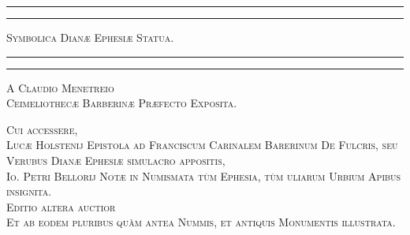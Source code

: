 \documentclass[a4paper, 11pt, oneside, polutonikogreek, latin]{article}
\begin{document}
\renewcommand{\thefigure}{\Fontauri{\arabic{figure}}}
\renewcommand\thefootnote{\Fontauri{\arabic{footnote}}}
\let\oldfootnote\footnote
    \renewcommand{\footnote}[1]{\oldfootnote{\Fontauri\large#1}}
\begin{titlepage} %
	\centering %

	
	\rule{\textwidth}{1.6pt}\vspace*{-\baselineskip}\vspace*{2pt} %
	\rule{\textwidth}{0.4pt} %
	
	\vspace{1\baselineskip} %
	
	{\scshape\Huge Symbolica Dianæ Ephesiæ Statua.}
	
	\vspace{1\baselineskip} %

	\rule{\textwidth}{0.4pt}\vspace*{-\baselineskip}\vspace{3.2pt} %
	\rule{\textwidth}{1.6pt} %
	
	\vspace{1\baselineskip} %
	
	
	{\scshape \Large A Claudio Menetreio\\Ceimeliothecæ Barberinæ Præfecto Exposita.} %
	
	\vspace*{1\baselineskip} %
	
{\scshape Cui accessere,\\Lucæ Holstenij Epistola ad Franciscum Carinalem Barerinum De Fulcris, seu Verubus Dianæ Ephesiæ simulacro appositis,\\Io. Petri Bellorij Notæ in Numismata tùm Ephesia, tùm uliarum Urbium Apibus insignita.\\\vspace*{10mm}\small Editio altera auctior\\Et ab eodem pluribus quàm antea Nummis, et antiquis Monumentis illustrata.} %


\end{titlepage}
\end{document}
